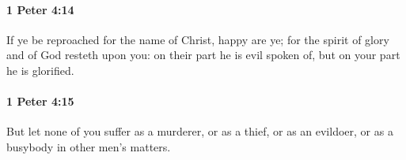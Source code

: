		\paragraph{1 Peter 4:14} %
			\label{1PETER-4-14}

			If ye be reproached for the name of Christ, happy are ye; for the spirit of glory and of God resteth upon you: on their part he is evil spoken of, but on your part he is glorified.

			\begin{framed}
			\scriptsize
				\begin{compactdesc}
					\item[SBLG] 
				\end{compactdesc}
			\end{framed}

		\paragraph{1 Peter 4:15} %
			\label{1PETER-4-15}

			But let none of you suffer as a murderer, or as a thief, or as an evildoer, or as a busybody in other men's matters.

